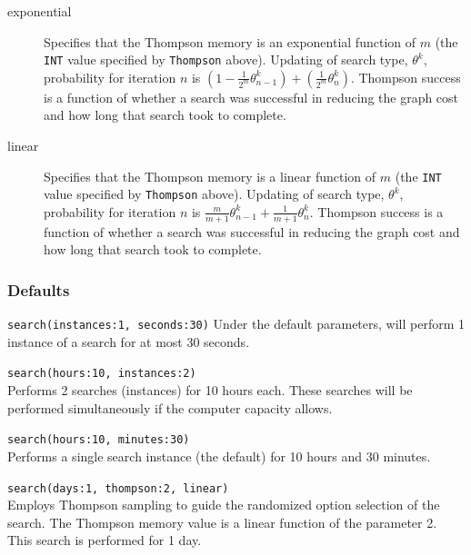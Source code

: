 \begin{description}
			\begin{description}
		
			\item[exponential] Specifies that the Thompson memory is an exponential function of 
			$m$ (the \texttt{INT} value specified by \texttt{Thompson} above). Updating of search 
			type, $\theta^k$, probability for iteration $n$ is $ \left(1 - \frac{1}{2^m} \theta^k_{n-1}\right) 
			+ \left(\frac{1}{2^m} \theta^k_n \right)$. Thompson success is a function of whether a 
			search was successful in reducing the graph cost and how long that search took to complete.
			
			\item[linear] Specifies that the Thompson memory is a linear function of $m$ (the 
			\texttt{INT} value specified by \texttt{Thompson} above). Updating of search type, $\theta^k$, 
			probability for iteration $n$ is $\frac{m}{m+1} \theta^k_{n-1} + \frac{1}{m+1} \theta^k_n$.  
			Thompson success is a function of whether a search was successful in reducing the graph 
			cost and how long that search took to complete.

			\end{description}
	\end{description}		
	
	\subsubsection{Defaults}
		\texttt{search(instances:1, seconds:30)} Under the default parameters, \phyg will perform 1 
		instance of a search for at most 30 seconds.
		
	\begin{example}
		\item{\texttt{search(hours:10, instances:2)}\\ Performs 2 searches (instances) for 10 hours 
		each. These searches will be performed simultaneously if the computer capacity allows.}
				
		\item{\texttt{search(hours:10, minutes:30)}\\ Performs a single search instance (the default) 
		for 10 hours and 30 minutes.}
		
		\item{\texttt{search(days:1, thompson:2, linear)}\\ Employs Thompson sampling to guide the 
		randomized option selection of the search. The Thompson memory value is a linear function 
		of the parameter 2. This search is performed for 1 day.}
	\end{example}
	
